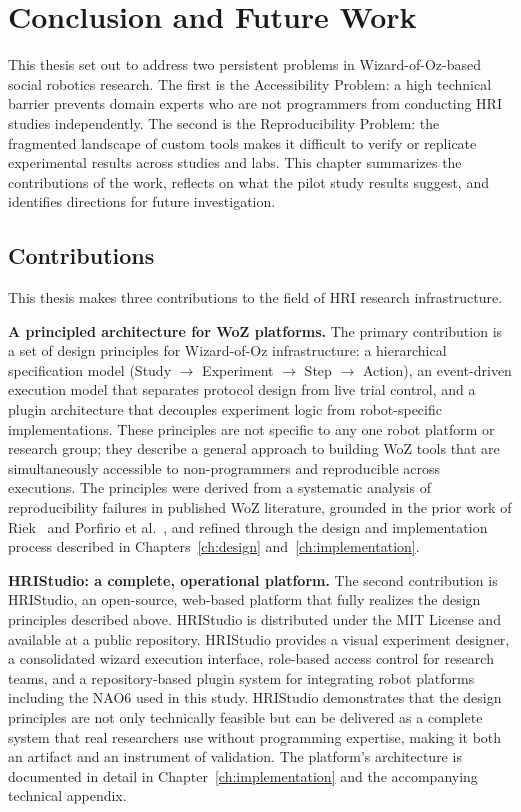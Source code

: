 \chapter{Conclusion and Future Work}
\label{ch:conclusion}

This thesis set out to address two persistent problems in Wizard-of-Oz-based social robotics research. The first is the Accessibility Problem: a high technical barrier prevents domain experts who are not programmers from conducting HRI studies independently. The second is the Reproducibility Problem: the fragmented landscape of custom tools makes it difficult to verify or replicate experimental results across studies and labs. This chapter summarizes the contributions of the work, reflects on what the pilot study results suggest, and identifies directions for future investigation.

\section{Contributions}

This thesis makes three contributions to the field of HRI research infrastructure.

\textbf{A principled architecture for WoZ platforms.} The primary contribution is a set of design principles for Wizard-of-Oz infrastructure: a hierarchical specification model (Study $\to$ Experiment $\to$ Step $\to$ Action), an event-driven execution model that separates protocol design from live trial control, and a plugin architecture that decouples experiment logic from robot-specific implementations. These principles are not specific to any one robot platform or research group; they describe a general approach to building WoZ tools that are simultaneously accessible to non-programmers and reproducible across executions. The principles were derived from a systematic analysis of reproducibility failures in published WoZ literature, grounded in the prior work of Riek~\cite{Riek2012} and Porfirio et al.~\cite{Porfirio2023}, and refined through the design and implementation process described in Chapters~\ref{ch:design} and~\ref{ch:implementation}.

\textbf{HRIStudio: a complete, operational platform.} The second contribution is HRIStudio, an open-source, web-based platform that fully realizes the design principles described above. HRIStudio is distributed under the MIT License and available at a public repository. HRIStudio provides a visual experiment designer, a consolidated wizard execution interface, role-based access control for research teams, and a repository-based plugin system for integrating robot platforms including the NAO6 used in this study. HRIStudio demonstrates that the design principles are not only technically feasible but can be delivered as a complete system that real researchers use without programming expertise, making it both an artifact and an instrument of validation. The platform's architecture is documented in detail in Chapter~\ref{ch:implementation} and the accompanying technical appendix.

